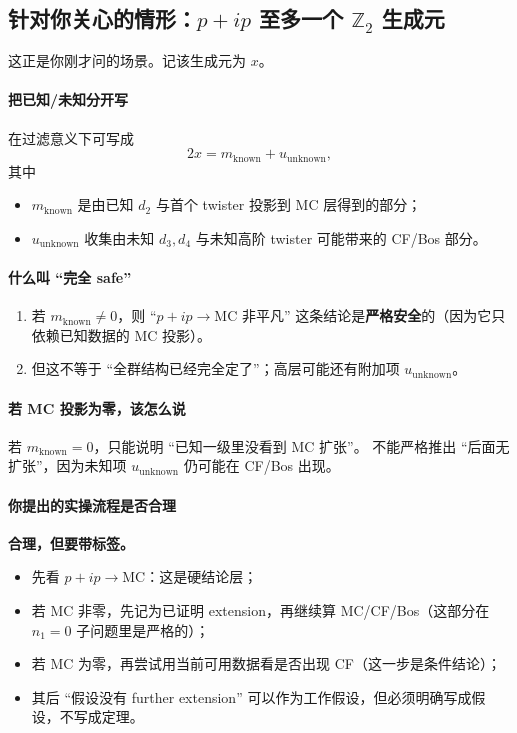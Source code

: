 \documentclass[a4paper,fontset=ubuntu,12pt]{ctexart}
\begin{document}
\subsection{针对你关心的情形：$p+ip$ 至多一个 $\mathbb{Z}_2$ 生成元}

这正是你刚才问的场景。记该生成元为 $x$。

\paragraph{把已知/未知分开写}
在过滤意义下可写成
\begin{equation}
2x = m_{\mathrm{known}} + u_{\mathrm{unknown}},
\label{eq:2x-known-unknown}
\end{equation}
其中
\begin{itemize}
\item $m_{\mathrm{known}}$ 是由已知 $d_2$ 与首个 twister 投影到 MC 层得到的部分；
\item $u_{\mathrm{unknown}}$ 收集由未知 $d_3,d_4$ 与未知高阶 twister 可能带来的 CF/Bos 部分。
\end{itemize}

\paragraph{什么叫 ``完全 safe''}
\begin{enumerate}
\item 若 $m_{\mathrm{known}}\neq 0$，则 ``$p+ip\to$MC 非平凡'' 这条结论是\textbf{严格安全}的（因为它只依赖已知数据的 MC 投影）。
\item 但这不等于 ``全群结构已经完全定了''；高层可能还有附加项 $u_{\mathrm{unknown}}$。
\end{enumerate}

\paragraph{若 MC 投影为零，该怎么说}
若 $m_{\mathrm{known}}=0$，只能说明 ``已知一级里没看到 MC 扩张''。  
不能严格推出 ``后面无扩张''，因为未知项 $u_{\mathrm{unknown}}$ 仍可能在 CF/Bos 出现。

\paragraph{你提出的实操流程是否合理}
\textbf{合理，但要带标签。}
\begin{itemize}
\item 先看 $p+ip\to$MC：这是硬结论层；
\item 若 MC 非零，先记为已证明 extension，再继续算 MC/CF/Bos（这部分在 $n_1=0$ 子问题里是严格的）；
\item 若 MC 为零，再尝试用当前可用数据看是否出现 CF（这一步是条件结论）；
\item 其后 ``假设没有 further extension'' 可以作为工作假设，但必须明确写成假设，不写成定理。
\end{itemize}
\end{document}
